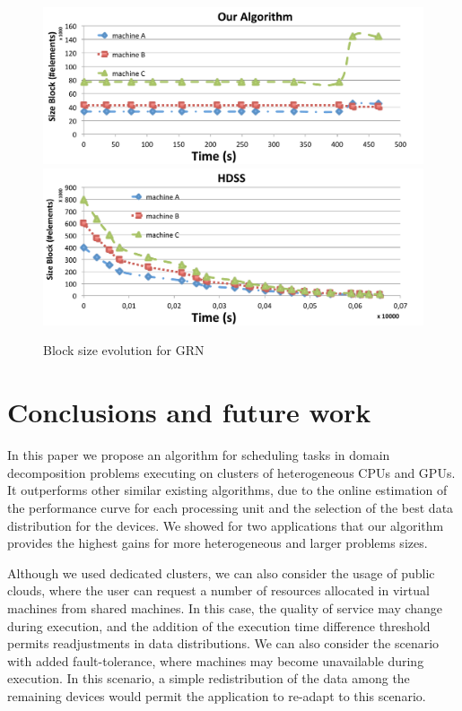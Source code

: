\documentclass[journal]{IEEEtran}
\begin{document}
\begin{figure}[htb]
	\begin{center}
	\centering
			\includegraphics[scale=0.345]{Block_Comportamento_Nosso.pdf}\quad
			\includegraphics[scale=0.345]{Block_Comportamento_Deles.pdf}
	\caption{Block size evolution for GRN}
	\label{fig:GeneBlocos}
	\end{center}
\end{figure}


\section{Conclusions and future work}

In this paper we propose an algorithm for scheduling tasks in domain
decomposition problems executing on clusters of heterogeneous CPUs and GPUs. It
outperforms other similar existing algorithms, due to the online estimation of
the performance curve for each processing unit and the selection of the best
data distribution for the devices. We showed for two applications that our
algorithm provides the highest gains for more heterogeneous and larger problems
sizes.

Although we used dedicated clusters, we can also consider the usage of public
clouds, where the user can request a number of resources allocated in virtual
machines from shared machines. In this case, the quality of service may change
during execution, and the addition of the execution time difference threshold
permits readjustments in data distributions. We can also consider the scenario
with added fault-tolerance, where machines may become unavailable during
execution. In this scenario, a simple redistribution of the data among the
remaining devices would permit the application to re-adapt to this scenario.
\end{document}
